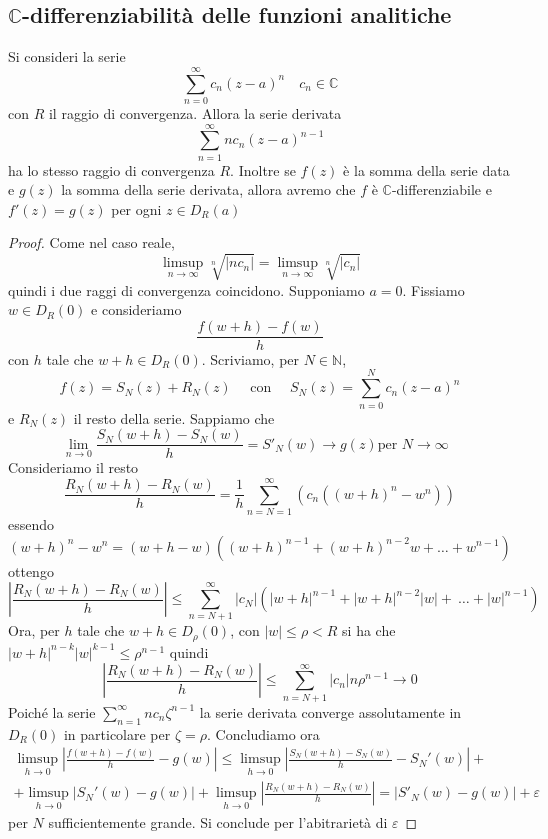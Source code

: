 \subsection{\(\mathbb{C}\)-differenziabilità delle funzioni analitiche}
\begin{theorem}
    Si consideri la serie 
    \[
        \sum_{n=0}^{\infty} c_{n} {\left( z-a \right)}^{n} \quad c_{n} \in \mathbb{C} 
    \]
    con \(R\) il raggio di convergenza.
    Allora la serie derivata 
    \[
        \sum_{n=1}^{\infty} nc_{n} {\left( z-a \right)}^{n-1}
    \] ha lo stesso raggio di convergenza \(R\). Inoltre se \(f(z)\) è la somma
    della serie data e \(g(z)\) la somma della serie derivata, allora avremo che
    \(f\) è \(\mathbb{C}\)-differenziabile e \(f'(z) = g(z)\) per ogni \(z \in
    D_R(a)\)
\end{theorem}
\begin{proof}
    Come nel caso reale,
    \[
        \limsup_{n \to \infty} \sqrt[n]{|nc_{n}|} = \limsup_{n\to \infty}{\sqrt[n]{|c_{n}|}} 
    \]
    quindi i due raggi di convergenza coincidono. Supponiamo \(a=0\). Fissiamo
    \(w \in D_R(0)\) e consideriamo
    \[
        \frac{f(w+h) - f(w)}{h}
    \] con \(h\) tale che \(w+h \in D_R(0)\). Scriviamo, per \(N \in
    \mathbb{N}\),
    \[
        f(z) = S_N(z) + R_N(z) \quad \text{ con } \quad S_N(z) = \sum_{n=0}^{N}
        c_{n} {\left( z - a \right)}^{n}
    \]
    e \(R_N(z)\) il resto della serie. Sappiamo che 
    \[
        \lim_{n \to 0} \frac{S_N(w + h) - S_N(w)}{h} = S'_N(w) \to g(z) \text{
        per \(N\to \infty\)  }
    \]
    Consideriamo il resto
    \[
        \frac{R_N(w +h) - R_N(w)}{h} = \frac{1}{h} \sum_{n=N=1}^{\infty} {\left(
        c_{n} {\left( {\left( w+h \right)}^{n} - w^{n} \right)} \right)}  
    \]
    essendo
    \[
        {\left( w + h \right)}^{n} - w^{n} = {\left( w + h - w \right)} {\left(
        {\left( w+h \right)}^{n-1} + {\left( w+h \right)}^{n-2} w + \dots +
w^{n-1}\right)} 
    \]
    ottengo
    \[
        \left| \frac{R_N(w+h)-R_N(w)}{h} \right| \le \sum_{n=N+1}^{\infty} |c_N| {\left( |w+h|^{n-1}
        +|w+h|^{n-2} |w| +~\dots + |w|^{n-1}\right)} 
    \]
    Ora, per \(h\) tale che \(w+h \in D_\rho(0)\), con \(|w| \le \rho < R\) si
    ha che \(|w+h|^{n-k} |w|^{k-1} \le \rho^{n-1}\) quindi
    \[
        \left| \frac{R_N(w+h) -R_N(w)}{h} \right| \le \sum_{n=N+1}^{\infty}
        |c_n| n \rho^{n-1} \to 0
    \]
    Poiché la serie \(\sum_{n=1}^{\infty} nc_{n} \zeta^{n-1} \) la serie
    derivata converge assolutamente in \(D_R(0)\) in particolare per \(\zeta =
    \rho\). 
    Concludiamo ora 
    \begin{align*}
        \limsup_{h\to 0} \left| \frac{f(w+h) - f(w)}{h} -g(w)\right| \le
        \limsup_{h\to 0} \left| \frac{S_N(w+h) - S_N(w)}{h} - S_N'(w) \right| +
        \\ +
        \limsup_{h \to 0} \left| S_N'(w) - g(w) \right| + \limsup_{h\to 0}
        \left| \frac{R_N(w+h) - R_N(w)}{h} \right| = |S'_N(w) - g(w)| +
        \varepsilon
    \end{align*}
    per \(N\) sufficientemente grande. Si conclude per l'abitrarietà di \(\varepsilon\) 
\end{proof}

